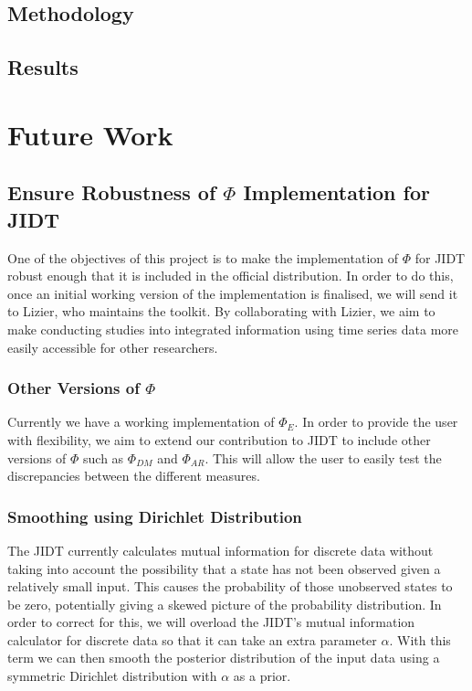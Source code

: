 \documentclass[a4paper,11pt]{article}
\begin{document}
\subsection{Methodology}
\subsection{Results}

\section{Future Work} \label{sec:fw}

\subsection{Ensure Robustness of $\Phi$ Implementation for JIDT} \label{sec:fw:jidt}

One of the objectives of this project is to make the implementation of $\Phi$ for JIDT robust enough that it is included in the official distribution. In order to do this, once an initial working version of the implementation is finalised, we will send it to Lizier, who maintains the toolkit. By collaborating with Lizier, we aim to make conducting studies into integrated information using time series data more easily accessible for other researchers.

\subsubsection{Other Versions of $\Phi$}
Currently we have a working implementation of $\Phi_{E}$. In order to provide the user with flexibility, we aim to extend our contribution to JIDT to include other versions of $\Phi$ such as $\Phi_{DM}$ and $\Phi_{AR}$. This will allow the user to easily test the discrepancies between the different measures.

\subsubsection{Smoothing using Dirichlet Distribution}
The JIDT currently calculates mutual information for discrete data without taking into account the possibility that a state has not been observed given a relatively small input. This causes the probability of those unobserved states to be zero, potentially giving a skewed picture of the probability distribution. In order to correct for this, we will overload the JIDT's mutual information calculator for discrete data so that it can take an extra parameter $\alpha$. With this term we can then smooth the posterior distribution of the input data using a symmetric Dirichlet distribution with $\alpha$ as a prior.
\end{document}
